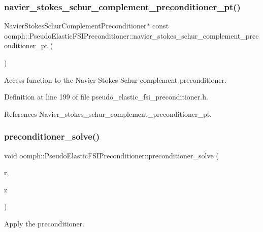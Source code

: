 \subsubsection{\texorpdfstring{navier\+\_\+stokes\+\_\+schur\+\_\+complement\+\_\+preconditioner\+\_\+pt()}{navier\_stokes\_schur\_complement\_preconditioner\_pt()}}
{\footnotesize\ttfamily Navier\+Stokes\+Schur\+Complement\+Preconditioner$\ast$ const oomph\+::\+Pseudo\+Elastic\+F\+S\+I\+Preconditioner\+::navier\+\_\+stokes\+\_\+schur\+\_\+complement\+\_\+preconditioner\+\_\+pt (\begin{DoxyParamCaption}{ }\end{DoxyParamCaption})\hspace{0.3cm}{\ttfamily [inline]}}



Access function to the Navier Stokes Schur complement preconditioner. 



Definition at line 199 of file pseudo\+\_\+elastic\+\_\+fsi\+\_\+preconditioner.\+h.



References Navier\+\_\+stokes\+\_\+schur\+\_\+complement\+\_\+preconditioner\+\_\+pt.

\mbox{\label{classoomph_1_1PseudoElasticFSIPreconditioner_ad29c2852949caec2d20cbe7cf99f1b38}} 
\subsubsection{\texorpdfstring{preconditioner\+\_\+solve()}{preconditioner\_solve()}}
{\footnotesize\ttfamily void oomph\+::\+Pseudo\+Elastic\+F\+S\+I\+Preconditioner\+::preconditioner\+\_\+solve (\begin{DoxyParamCaption}\item[{const Double\+Vector \&}]{r,  }\item[{Double\+Vector \&}]{z }\end{DoxyParamCaption})}



Apply the preconditioner. 



